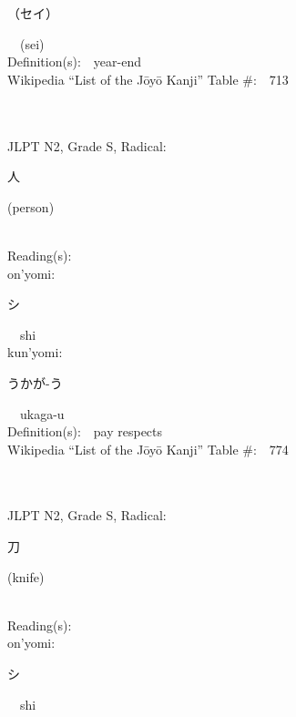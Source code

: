 \begin{multicols}{2}
{\hspace*{2em}}{\begin{CJK}{UTF8}{min} （セイ） \end{CJK}}\ \ (sei)\ \ \\
Definition(s):\ \ year-end \\
Wikipedia ``List of the J\=oy\=o Kanji'' Table \#:\ \ 713 \\
\ \ \\
{\fontsize{34pt}{40pt}  }\ \ \\  %
{JLPT N2, Grade S, Radical:\ \ {\begin{CJK}{UTF8}{min} 人 \end{CJK}} (person) } \\
Reading(s):\ \ \\
{\hspace*{1em}}on'yomi:\ \ \\
{\hspace*{2em}}{\begin{CJK}{UTF8}{min} シ \end{CJK}}\ \ shi\ \ \\
{\hspace*{1em}}kun'yomi:\ \ \\
{\hspace*{2em}}{\begin{CJK}{UTF8}{min} うかが-う \end{CJK}}\ \ ukaga-u\ \ \\
Definition(s):\ \ pay respects \\
Wikipedia ``List of the J\=oy\=o Kanji'' Table \#:\ \ 774 \\
\ \ \\
{\fontsize{34pt}{40pt}  }\ \ \\  %
{JLPT N2, Grade S, Radical:\ \ {\begin{CJK}{UTF8}{min} 刀 \end{CJK}} (knife) } \\
Reading(s):\ \ \\
{\hspace*{1em}}on'yomi:\ \ \\
{\hspace*{2em}}{\begin{CJK}{UTF8}{min} シ \end{CJK}}\ \ shi\ \ \\

\end{multicols}
